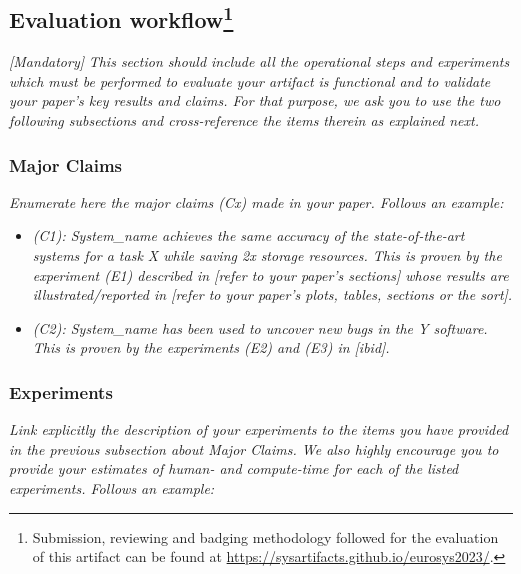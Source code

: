 \subsection{Evaluation workflow\footnote{
Submission, reviewing and badging methodology followed for the evaluation of this artifact can be found at \url{https://sysartifacts.github.io/eurosys2023/}.}}
{\em [Mandatory]} \textit{This section should include all the operational steps and experiments which must be performed to evaluate your artifact is functional and to validate your paper's key results and claims. For that purpose, we ask you to use the two following subsections and cross-reference the items therein as explained next.}

\subsubsection{Major Claims}
\textit{Enumerate here the major claims (Cx) made in your paper. Follows an example:}\\

\begin{itemize}
    \item \textit{(C1): System\_name achieves the same accuracy of the state-of-the-art systems for a task X while saving 2x storage resources. This is proven by the experiment (E1) described in [refer to your paper's sections] whose results are illustrated/reported in [refer to your paper's plots, tables, sections or the sort].}
    \item \textit{(C2): System\_name has been used to uncover new bugs in the Y software. This is proven by the experiments (E2) and (E3) in [ibid].}
\end{itemize}

\subsubsection{Experiments}
\textit{Link explicitly the description of your experiments to the items you have provided in the previous subsection about Major Claims. We also highly encourage you to provide your estimates of human- and compute-time for each of the listed experiments. Follows an example:}
~\\

